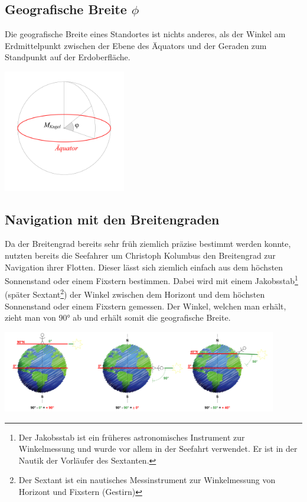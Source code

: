 \begin{refsection}
\subsection{Geografische Breite $\phi$}
\begin{definition}
Die geografische Breite eines Standortes ist nichts anderes, als der Winkel am Erdmittelpunkt zwischen der Ebene des Äquators und der Geraden zum Standpunkt auf der Erdoberfläche.
\end{definition}

\begin{center}
        \includegraphics[width=0.4\textwidth]{kugel/GeografischeBreite.jpg}
\end{center}


\subsection{Navigation mit den Breitengraden}  \label{BreitengradM}
Da der Breitengrad bereits sehr früh ziemlich präzise bestimmt werden konnte, nutzten bereits die Seefahrer um Christoph Kolumbus den Breitengrad zur Navigation ihrer Flotten.
Dieser lässt sich ziemlich einfach aus dem höchsten Sonnenstand oder einem Fixstern bestimmen. Dabei wird mit einem Jakobsstab\footnote{%
Der Jakobsstab ist ein früheres astronomisches Instrument zur Winkelmessung und wurde vor allem in der Seefahrt verwendet. Er ist in der Nautik der Vorläufer des Sextanten.} (später Sextant\footnote{%
Der Sextant ist ein nautisches Messinstrument zur Winkelmessung von Horizont und Fixstern (Gestirn)}) der Winkel zwischen dem Horizont und dem höchsten Sonnenstand oder einem Fixstern gemessen. Der Winkel, welchen man erhält, zieht man von 90° ab und erhält somit die geografische Breite. 

\begin{center}
        \includegraphics[width=0.9\textwidth]{kugel/Breitengrad.jpg}
\end{center}


\end{refsection}
